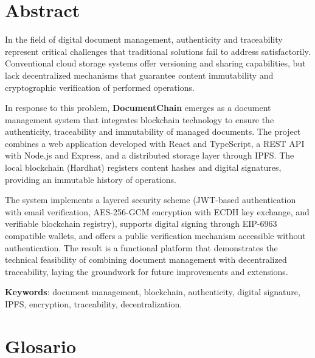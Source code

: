 \documentclass[11pt, a4paper]{article}
\begin{document}
\section*{Abstract}

In the field of digital document management, authenticity and traceability represent critical challenges that traditional solutions fail to address satisfactorily. Conventional cloud storage systems offer versioning and sharing capabilities, but lack decentralized mechanisms that guarantee content immutability and cryptographic verification of performed operations.

In response to this problem, \textbf{DocumentChain} emerges as a document management system that integrates blockchain technology to ensure the authenticity, traceability and immutability of managed documents. The project combines a web application developed with React and TypeScript, a REST API with Node.js and Express, and a distributed storage layer through IPFS. The local blockchain (Hardhat) registers content hashes and digital signatures, providing an immutable history of operations.

The system implements a layered security scheme (JWT-based authentication with email verification, AES-256-GCM encryption with ECDH key exchange, and verifiable blockchain registry), supports digital signing through EIP-6963 compatible wallets, and offers a public verification mechanism accessible without authentication. The result is a functional platform that demonstrates the technical feasibility of combining document management with decentralized traceability, laying the groundwork for future improvements and extensions.

\textbf{Keywords}: document management, blockchain, authenticity, digital signature, IPFS, encryption, traceability, decentralization.

\newpage
\tableofcontents
\newpage
\listoffigures
\newpage
\listoftables
\newpage

\section*{Glosario}
\end{document}
